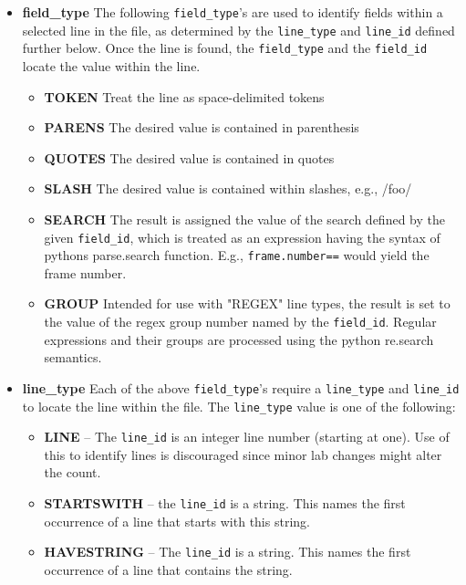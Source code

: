 \documentclass[12pt]{article}
\begin{document}
\begin{itemize}
\item \textbf{field\_type} The following {\tt field\_type}'s are used to 
identify fields within a selected line in the file, as determined by the {\tt line\_type} and {\tt line\_id} defined
further below. Once the line is found, the {\tt field\_type} and the {\tt field\_id} locate the value within the line.
\begin {itemize}
\item \textbf{TOKEN} Treat the line as space-delimited tokens
\item \textbf{PARENS} The desired value is contained in parenthesis
\item \textbf{QUOTES} The desired value is contained in quotes
\item \textbf{SLASH}  The desired value is contained within slashes, e.g., /foo/
\item \textbf{SEARCH} The result is assigned the value of the search 
defined by the given {\tt field\_id}, which is treated as an
expression having the syntax of pythons parse.search 
function.  E.g., {\tt frame.number==} would 
yield the frame number.
\item \textbf{GROUP} Intended for use with "REGEX" line types, the result is set to the value of the regex group 
number named by the {\tt field\_id}.  Regular expressions and their groups are processed using the python
re.search semantics.
\end{itemize}
\item \textbf{line\_type} Each of the above {\tt field\_type}'s require a {\tt line\_type} and {\tt line\_id} to locate the line within the file.
The {\tt line\_type} value is one of the following:
\begin{itemize}
\item \textbf{LINE}           --  The {\tt line\_id} is an integer line number 
                                   (starting at one).  Use of this to identify 
                                   lines is discouraged since minor lab changes 
                                   might alter the count.
\item \textbf{STARTSWITH}     --  the {\tt line\_id} is a string.  This names the 
                                   first occurrence of a line that starts with 
                                   this string. 
\item \textbf{HAVESTRING}      -- The {\tt line\_id} is a string.  This names the 
                                   first occurrence of a line that contains the 
                                   string.

\end{itemize}
\end{itemize}
\end{document}
